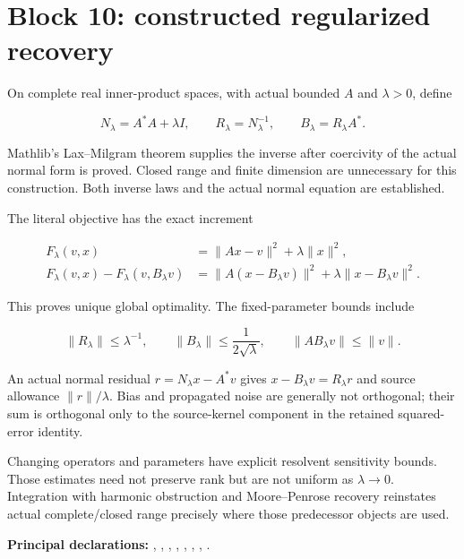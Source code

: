 \documentclass[11pt]{article}
\begin{document}
\hypertarget{block-10-constructed-regularized-recovery}{%
\section{Block 10: constructed regularized
recovery}\label{block-10-constructed-regularized-recovery}}

On complete real inner-product spaces, with actual bounded \(A\) and
\(\lambda>0\), define

\[
N_\lambda=A^*A+\lambda I,\qquad
R_\lambda=N_\lambda^{-1},\qquad
B_\lambda=R_\lambda A^*.
\]

Mathlib's Lax--Milgram theorem supplies the inverse after coercivity of
the actual normal form is proved. Closed range and finite dimension are
unnecessary for this construction. Both inverse laws and the actual
normal equation are established.

The literal objective has the exact increment

\[
\begin{aligned}
F_\lambda(v,x)&=\|Ax-v\|^2+\lambda\|x\|^2,\\
F_\lambda(v,x)-F_\lambda(v,B_\lambda v)
&=\|A(x-B_\lambda v)\|^2+\lambda\|x-B_\lambda v\|^2.
\end{aligned}
\]

This proves unique global optimality. The fixed-parameter bounds include

\[
\|R_\lambda\|\le\lambda^{-1},\qquad
\|B_\lambda\|\le\frac1{2\sqrt\lambda},\qquad
\|AB_\lambda v\|\le\|v\|.
\]

An actual normal residual \(r=N_\lambda x-A^*v\) gives
\(x-B_\lambda v=R_\lambda r\) and source allowance \(\|r\|/\lambda\).
Bias and propagated noise are generally not orthogonal; their sum is
orthogonal only to the source-kernel component in the retained
squared-error identity.

Changing operators and parameters have explicit resolvent sensitivity
bounds. Those estimates need not preserve rank but are not uniform as
\(\lambda\to0\). Integration with harmonic obstruction and
Moore--Penrose recovery reinstates actual complete/closed range
precisely where those predecessor objects are used.

\textbf{Principal declarations:}
\texttt{},
\texttt{},
\texttt{},
\texttt{},
\texttt{},
\texttt{},
\texttt{},
\texttt{}.
\end{document}
